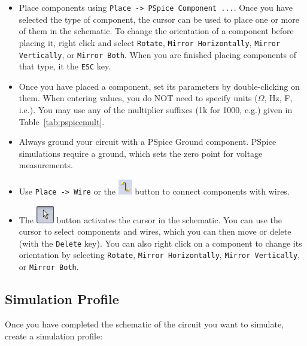 \documentclass[11pt]{article}
\begin{document}
\begin{itemize}
\item Place components using \texttt{Place -> PSpice Component
  ...}. Once you have selected the type of component, the cursor can
  be used to place one or more of them in the schematic. To change the
  orientation of a component before placing it, right click and select
  \texttt{Rotate}, \texttt{Mirror Horizontally},
  \texttt{Mirror Vertically}, or \texttt{Mirror Both}.
  When you are finished placing components of that type, it the
  \texttt{ESC} key.

\item Once you have placed a component, set its parameters by
  double-clicking on them. When entering values, you do NOT need to
  specify units ($\Omega$, Hz, F, i.e.). You may use any of the
  multiplier suffixes (1k for 1000, e.g.) given in
  Table~\ref{tab:pspicemult}.

\item Always ground your circuit with a PSpice Ground
  component. PSpice simulations require a ground, which sets the zero
  point for voltage measurements.

\item Use \texttt{Place -> Wire} or the
  \includegraphics{Schematic_Wire.png} button to connect components
  with wires.

\item The \includegraphics{Schematic_Cursor.png} button activates the
  cursor in the schematic. You can use the cursor to select
  components and wires, which you can then move or delete (with the
  \texttt{Delete} key). You can also right click on a component to
  change its orientation by selecting \texttt{Rotate},
  \texttt{Mirror Horizontally}, \texttt{Mirror Vertically}, or
  \texttt{Mirror Both}.
\end{itemize}

\subsection{Simulation Profile}

Once you have completed the schematic of the circuit you want to
simulate, create a simulation profile:
\end{document}
